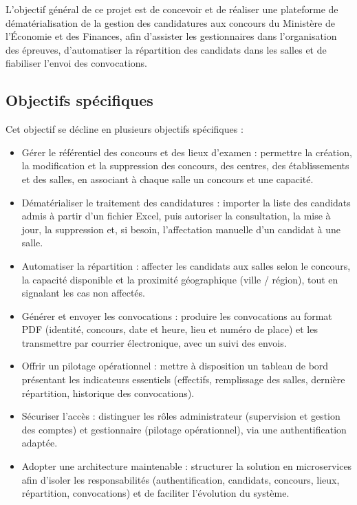 \begin{onehalfspace}
L'objectif général de ce projet est de concevoir et de réaliser une plateforme de dématérialisation de la gestion des candidatures aux concours du Ministère de l'Économie et des Finances, afin d'assister les gestionnaires dans l'organisation des épreuves, d'automatiser la répartition des candidats dans les salles et de fiabiliser l'envoi des convocations.

\subsection{Objectifs spécifiques}

Cet objectif se décline en plusieurs objectifs spécifiques :

\begin{itemize}
  \item Gérer le référentiel des concours et des lieux d'examen : permettre la création, la modification et la suppression des concours, des centres, des établissements et des salles, en associant à chaque salle un concours et une capacité.
  \item Dématérialiser le traitement des candidatures : importer la liste des candidats admis à partir d'un fichier Excel, puis autoriser la consultation, la mise à jour, la suppression et, si besoin, l'affectation manuelle d'un candidat à une salle.
  \item Automatiser la répartition : affecter les candidats aux salles selon le concours, la capacité disponible et la proximité géographique (ville / région), tout en signalant les cas non affectés.
  \item Générer et envoyer les convocations : produire les convocations au format PDF (identité, concours, date et heure, lieu et numéro de place) et les transmettre par courrier électronique, avec un suivi des envois.
  \item Offrir un pilotage opérationnel : mettre à disposition un tableau de bord présentant les indicateurs essentiels (effectifs, remplissage des salles, dernière répartition, historique des convocations).
  \item Sécuriser l'accès : distinguer les rôles administrateur (supervision et gestion des comptes) et gestionnaire (pilotage opérationnel), via une authentification adaptée.
  \item Adopter une architecture maintenable : structurer la solution en microservices afin d'isoler les responsabilités (authentification, candidats, concours, lieux, répartition, convocations) et de faciliter l'évolution du système.
\end{itemize}


\end{onehalfspace}
